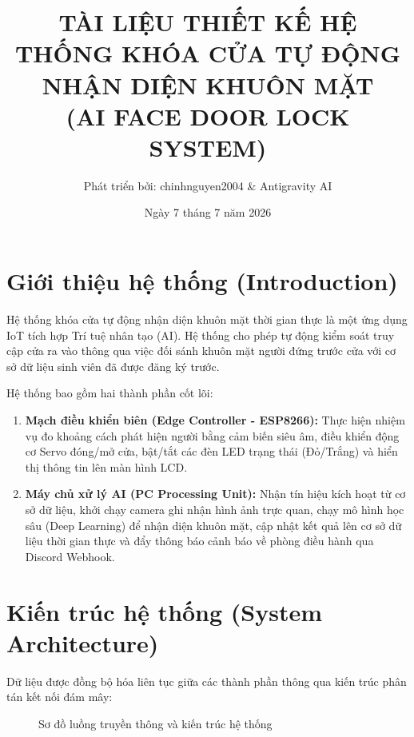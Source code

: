 \documentclass[12pt,a4paper]{article}
\title{TÀI LIỆU THIẾT KẾ HỆ THỐNG KHÓA CỬA TỰ ĐỘNG NHẬN DIỆN KHUÔN MẶT\\(AI FACE DOOR LOCK SYSTEM)}
\author{Phát triển bởi: chinhnguyen2004 \& Antigravity AI}
\date{Ngày 7 tháng 7 năm 2026}
\begin{document}
\maketitle
\tableofcontents
\newpage

\section{Giới thiệu hệ thống (Introduction)}
Hệ thống khóa cửa tự động nhận diện khuôn mặt thời gian thực là một ứng dụng IoT tích hợp Trí tuệ nhân tạo (AI). Hệ thống cho phép tự động kiểm soát truy cập cửa ra vào thông qua việc đối sánh khuôn mặt người đứng trước cửa với cơ sở dữ liệu sinh viên đã được đăng ký trước.

Hệ thống bao gồm hai thành phần cốt lõi:
\begin{enumerate}
    \item \textbf{Mạch điều khiển biên (Edge Controller - ESP8266):} Thực hiện nhiệm vụ đo khoảng cách phát hiện người bằng cảm biến siêu âm, điều khiển động cơ Servo đóng/mở cửa, bật/tắt các đèn LED trạng thái (Đỏ/Trắng) và hiển thị thông tin lên màn hình LCD.
    \item \textbf{Máy chủ xử lý AI (PC Processing Unit):} Nhận tín hiệu kích hoạt từ cơ sở dữ liệu, khởi chạy camera ghi nhận hình ảnh trực quan, chạy mô hình học sâu (Deep Learning) để nhận diện khuôn mặt, cập nhật kết quả lên cơ sở dữ liệu thời gian thực và đẩy thông báo cảnh báo về phòng điều hành qua Discord Webhook.
\end{enumerate}

\newpage
\section{Kiến trúc hệ thống (System Architecture)}

Dữ liệu được đồng bộ hóa liên tục giữa các thành phần thông qua kiến trúc phân tán kết nối đám mây:

\begin{figure}[h]
\centering
{}
\caption{Sơ đồ luồng truyền thông và kiến trúc hệ thống}
\end{figure}
\end{document}
